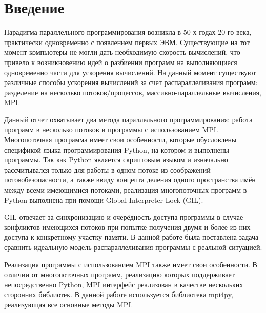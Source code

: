 \documentclass[12pt]{report}
\begin{document}
\chapter*{Введение}
\par Парадигма параллельного программирования возникла в 50-х годах 20-го века, практически одновременно с появлением первых ЭВМ. Существующие на тот момент компьютеры не могли дать необходимую скорость вычислений, что привело к возникновению идей о разбиении программ на выполняющиеся одновременно части для ускорения вычислений. На данный момент существуют различные способы ускорения вычислений за счет распараллеливания программ: разделение на несколько потоков/процессов, массивно-параллельные вычисления, MPI. 
\par Данный отчет охватывает два метода параллельного программирования: работа программ в несколько потоков и программы с использованием MPI. Многопоточная программа имеет свои особенности, которые обусловлены спецификой языка программирования Python, на котором и выполнены программы. Так как Python является скриптовым языком и изначально рассчитывался только для работы в одном потоке из соображений потокобезопасности, а также ввиду концепта деления одного пространства имён между всеми имеющимися потоками, реализация многопоточных программ в Python выполнена при помощи Global Interpreter Lock (GIL).
\par GIL отвечает за синхронизацию и очерёдность доступа программы в случае конфликтов имеющихся потоков при попытке получения двумя и более из них доступа к конкретному участку памяти. В данной работе была поставлена задача сравнить идеальную модель распараллеливания программы с реальной ситуацией.
\par Реализация программы с использованием MPI также имеет свои особенности. В отличии от многопоточных программ, реализацию которых поддерживает непосредственно Python, MPI интерфейс реализован в качестве нескольких сторонних библиотек. В данной работе используется библиотека mpi4py, реализующая все основные методы MPI.
\end{document}
